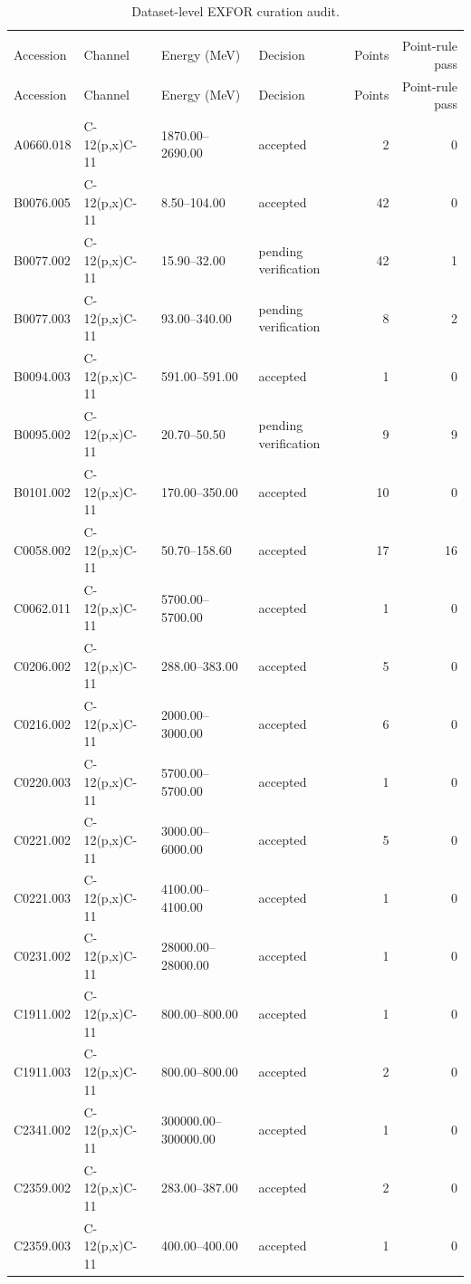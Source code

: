 \begin{longtable}{llllrr}
\toprule
\caption{Dataset-level EXFOR curation audit.}\label{tab:curation-detail}\\
Accession & Channel & Energy (MeV) & Decision & Points & Point-rule pass \\
\midrule
\endfirsthead
\toprule
Accession & Channel & Energy (MeV) & Decision & Points & Point-rule pass \\
\midrule
\endhead
A0660.018 & C-12(p,x)C-11 & 1870.00--2690.00 & accepted & 2 & 0 \\
B0076.005 & C-12(p,x)C-11 & 8.50--104.00 & accepted & 42 & 0 \\
B0077.002 & C-12(p,x)C-11 & 15.90--32.00 & pending verification & 42 & 1 \\
B0077.003 & C-12(p,x)C-11 & 93.00--340.00 & pending verification & 8 & 2 \\
B0094.003 & C-12(p,x)C-11 & 591.00--591.00 & accepted & 1 & 0 \\
B0095.002 & C-12(p,x)C-11 & 20.70--50.50 & pending verification & 9 & 9 \\
B0101.002 & C-12(p,x)C-11 & 170.00--350.00 & accepted & 10 & 0 \\
C0058.002 & C-12(p,x)C-11 & 50.70--158.60 & accepted & 17 & 16 \\
C0062.011 & C-12(p,x)C-11 & 5700.00--5700.00 & accepted & 1 & 0 \\
C0206.002 & C-12(p,x)C-11 & 288.00--383.00 & accepted & 5 & 0 \\
C0216.002 & C-12(p,x)C-11 & 2000.00--3000.00 & accepted & 6 & 0 \\
C0220.003 & C-12(p,x)C-11 & 5700.00--5700.00 & accepted & 1 & 0 \\
C0221.002 & C-12(p,x)C-11 & 3000.00--6000.00 & accepted & 5 & 0 \\
C0221.003 & C-12(p,x)C-11 & 4100.00--4100.00 & accepted & 1 & 0 \\
C0231.002 & C-12(p,x)C-11 & 28000.00--28000.00 & accepted & 1 & 0 \\
C1911.002 & C-12(p,x)C-11 & 800.00--800.00 & accepted & 1 & 0 \\
C1911.003 & C-12(p,x)C-11 & 800.00--800.00 & accepted & 2 & 0 \\
C2341.002 & C-12(p,x)C-11 & 300000.00--300000.00 & accepted & 1 & 0 \\
C2359.002 & C-12(p,x)C-11 & 283.00--387.00 & accepted & 2 & 0 \\
C2359.003 & C-12(p,x)C-11 & 400.00--400.00 & accepted & 1 & 0 \\

\end{longtable}

